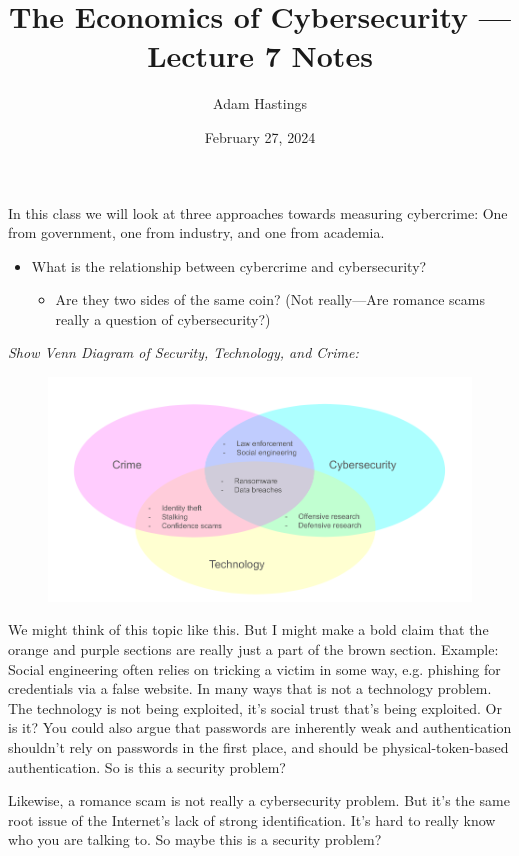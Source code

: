 \documentclass[11pt]{article}
\title{The Economics of Cybersecurity --- Lecture 7 Notes}
\date{February 27, 2024}
\author{Adam Hastings}
\begin{document}
\maketitle


In this class we will look at three approaches towards measuring cybercrime: One from government, one from industry, and one from academia.

\begin{itemize}
    \item What is the relationship between cybercrime and cybersecurity?
    \begin{itemize}
        \item Are they two sides of the same coin? (Not really---Are romance scams really a question of cybersecurity?)
    \end{itemize}
\end{itemize}

{\it Show Venn Diagram of Security, Technology, and Crime:}

\begin{figure}[H]
    \centering
    \includegraphics*[width=5.5in]{crime_vd.png}
\end{figure}


We might think of this topic like this. But I might make a bold claim that the orange and purple sections are really just a part of the brown section. Example: Social engineering often relies on tricking a victim in some way, e.g. phishing for credentials via a false website. In many ways that is not a technology problem. The technology is not being exploited, it's social trust that's being exploited. Or is it? You could also argue that passwords are inherently weak and authentication shouldn't rely on passwords in the first place, and should be physical-token-based authentication. So is this a security problem?


Likewise, a romance scam is not really a cybersecurity problem. But it's the same root issue of the Internet's lack of strong identification. It's hard to really know who you are talking to. So maybe this is a security problem?
\end{document}
